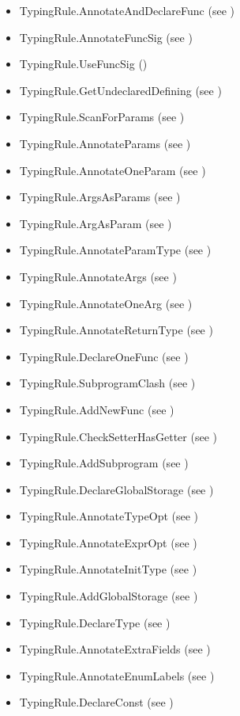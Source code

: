 \documentclass{book}
\begin{document}
\begin{itemize}
  \item TypingRule.AnnotateAndDeclareFunc (see )
  \item TypingRule.AnnotateFuncSig (see )
  \item TypingRule.UseFuncSig ()
  \item TypingRule.GetUndeclaredDefining (see )
  \item TypingRule.ScanForParams (see )
  \item TypingRule.AnnotateParams (see )
  \item TypingRule.AnnotateOneParam (see )
  \item TypingRule.ArgsAsParams (see )
  \item TypingRule.ArgAsParam (see )
  \item TypingRule.AnnotateParamType (see )
  \item TypingRule.AnnotateArgs (see )
  \item TypingRule.AnnotateOneArg (see )
  \item TypingRule.AnnotateReturnType (see )
  \item TypingRule.DeclareOneFunc (see )
  \item TypingRule.SubprogramClash (see )
  \item TypingRule.AddNewFunc (see )
  \item TypingRule.CheckSetterHasGetter (see )
  \item TypingRule.AddSubprogram (see )
  \item TypingRule.DeclareGlobalStorage (see )
  \item TypingRule.AnnotateTypeOpt (see )
  \item TypingRule.AnnotateExprOpt (see )
  \item TypingRule.AnnotateInitType (see )
  \item TypingRule.AddGlobalStorage (see )
  \item TypingRule.DeclareType (see )
  \item TypingRule.AnnotateExtraFields (see )
  \item TypingRule.AnnotateEnumLabels (see )
  \item TypingRule.DeclareConst (see )
\end{itemize}
\end{document}
